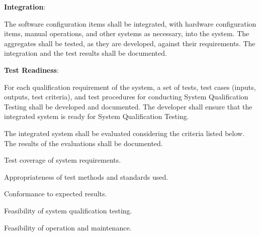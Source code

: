 			\begin{adjustwidth}{2em}{0pt} 

				\begin{compactenum}

					\item {\bf Integration}:

					\begin{compactenum}

							\item The software configuration items shall be integrated, with hardware configuration items, manual operations, and other systems as necessary, into the system. The aggregates shall be tested, as they are developed, against their requirements. The integration and the test results shall be documented.

					\end{compactenum}

					\item {\bf Test Readiness}:

					\begin{compactenum}

							\item For each qualification requirement of the system, a set of tests, test cases (inputs, outputs, test criteria), and test procedures for conducting System Qualification Testing shall be developed and documented. The developer shall ensure that the integrated system is ready for System Qualification Testing.

							\item The integrated system shall be evaluated considering the criteria listed below. The results of the evaluations shall be documented.

							\begin{compactenum}

								\item Test coverage of system requirements.

								\item Appropriateness of test methods and standards used.

								\item Conformance to expected results.

								\item Feasibility of system qualification testing.

								\item Feasibility of operation and maintenance.

							\end{compactenum}

					\end{compactenum}

				\end{compactenum}

			\end{adjustwidth}

